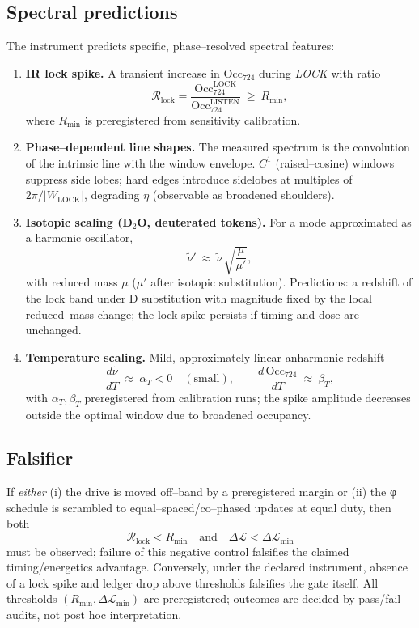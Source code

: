 \documentclass[11pt]{article}
\begin{document}
\subsection{Spectral predictions}
The instrument predicts specific, phase--resolved spectral features:
\begin{enumerate}
\item \textbf{IR lock spike.} A transient increase in $\mathrm{Occ}_{724}$ during \emph{LOCK} with ratio
\[
\mathcal{R}_{\mathrm{lock}}=\frac{\mathrm{Occ}_{724}^{\mathrm{LOCK}}}{\mathrm{Occ}_{724}^{\mathrm{LISTEN}}}\ \ge\ R_{\min},
\]
where $R_{\min}$ is preregistered from sensitivity calibration.
\item \textbf{Phase--dependent line shapes.} The measured spectrum is the convolution of the intrinsic line with the window envelope. $C^1$ (raised--cosine) windows suppress side lobes; hard edges introduce sidelobes at multiples of $2\pi/|W_{\mathrm{LOCK}}|$, degrading $\eta$ (observable as broadened shoulders).
\item \textbf{Isotopic scaling (D$_2$O, deuterated tokens).} For a mode approximated as a harmonic oscillator,
\[
\tilde\nu'\ \approx\ \tilde\nu\,\sqrt{\frac{\mu}{\mu'}},
\]
with reduced mass $\mu$ ($\mu'$ after isotopic substitution). Predictions: a redshift of the lock band under D substitution with magnitude fixed by the local reduced--mass change; the lock spike persists if timing and dose are unchanged.
\item \textbf{Temperature scaling.} Mild, approximately linear anharmonic redshift
\[
\frac{d\tilde\nu}{dT}\ \approx\ \alpha_T<0\quad(\text{small}),\qquad
\frac{d\,\mathrm{Occ}_{724}}{dT}\ \approx\ \beta_T,
\]
with $\alpha_T,\beta_T$ preregistered from calibration runs; the spike amplitude decreases outside the optimal window due to broadened occupancy.
\end{enumerate}

\subsection{Falsifier}
If \emph{either} (i) the drive is moved off--band by a preregistered margin or (ii) the φ schedule is scrambled to equal--spaced/co--phased updates at equal duty, then both
\[
\mathcal{R}_{\mathrm{lock}}<R_{\min}
\quad\text{and}\quad
\Delta\mathcal{L}<\Delta\mathcal{L}_{\min}
\]
must be observed; failure of this negative control falsifies the claimed timing/energetics advantage. Conversely, under the declared instrument, absence of a lock spike and ledger drop above thresholds falsifies the gate itself. All thresholds $(R_{\min},\Delta\mathcal{L}_{\min})$ are preregistered; outcomes are decided by pass/fail audits, not post hoc interpretation.
\end{document}
